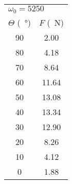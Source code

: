 \begin{table}[H]
    \begin{tabular}{cc}
        \toprule
        \multicolumn{2}{l}{$\omega_0 = 5250$} \\
        $\Theta$ (\SI{}{\degree}) & $F$ (\SI{}{\newton}) \\
        \midrule
        90 &  2.00 \\
        80 &  4.18 \\
        70 &  8.64 \\
        60 & 11.64 \\
        50 & 13.08 \\
        40 & 13.34 \\
        30 & 12.90 \\
        20 &  8.26 \\
        10 &  4.12 \\
         0 &  1.88 \\
        \bottomrule
    \end{tabular}
    \caption{}
\end{table}

